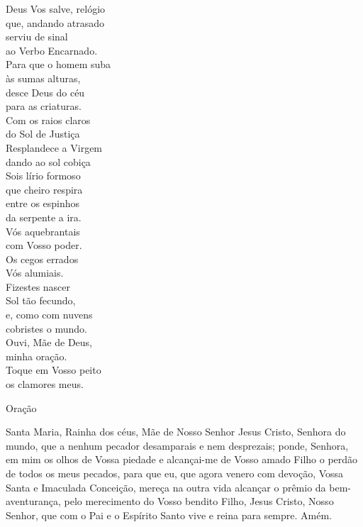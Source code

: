 \documentclass{book}
\begin{document}
\begin{multicols}{2}
    Deus Vos salve, relógio \\
    que, andando atrasado \\
    serviu de sinal \\
    ao Verbo Encarnado.
    \vspace{.2cm} \\
    Para que o homem suba \\
    às sumas alturas, \\
    desce Deus do céu \\
    para as criaturas.
    \vspace{.2cm} \\
    Com os raios claros \\
    do Sol de Justiça \\
    Resplandece a Virgem \\
    dando ao sol cobiça
    \vspace{.2cm} \\
    Sois lírio formoso \\
    que cheiro respira \\
    entre os espinhos \\
    da serpente a ira.
    \vspace{.2cm} \\
    Vós aquebrantais \\
    com Vosso poder. \\
    Os cegos errados \\
    Vós alumiais.
    \vspace{.2cm} \\
    Fizestes nascer \\
    Sol tão fecundo, \\
    e, como com nuvens \\
    cobristes o mundo.
    \vspace{.2cm} \\
    Ouvi, Mãe de Deus, \\
    minha oração. \\
    Toque em Vosso peito \\
    os clamores meus.
\end{multicols}
\begin{center}
    \textcolor{VioletRed2}{Oração}
\end{center}
\begin{flushleft}
    Santa Maria, Rainha dos céus, Mãe de Nosso Senhor Jesus Cristo, Senhora do mundo, que a nenhum pecador desamparais e nem desprezais; ponde, Senhora, em mim os olhos de Vossa piedade e alcançai-me de Vosso amado Filho o perdão de todos os meus pecados, para que eu, que agora venero com devoção, Vossa Santa e Imaculada Conceição, mereça na outra vida alcançar o prêmio da bem-aventurança, pelo merecimento do Vosso bendito Filho, Jesus Cristo, Nosso Senhor, que com o Pai e o Espírito Santo vive e reina para sempre. Amém.
\end{flushleft}
\end{document}

